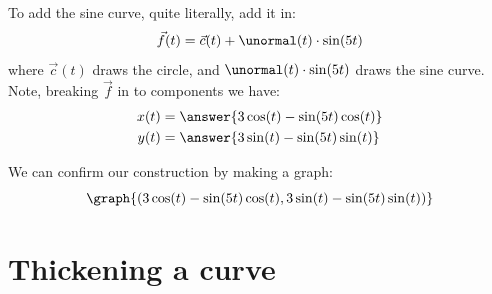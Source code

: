 \documentclass{ximera}
\begin{document}
\begin{example}
\begin{explanation}
\begin{image}
    \end{image}
    To add the sine curve, quite literally, add it in:
    \[
    \vec{f}(t) = \vec{c}(t) + \unormal(t)\cdot \sin(5t)
    \]
    where $\vec{c}(t)$ draws the circle, and $\unormal(t)\cdot
    \sin(5t)$ draws the sine curve. Note, breaking $\vec{f}$ in to components we have:
    \begin{align*}
      x(t) &= \answer{3\cos(t)-\sin(5t)\cos(t)}\\
      y(t) &= \answer{3\sin(t)-\sin(5t)\sin(t)}
    \end{align*}
    \begin{onlineOnly}
      We can confirm our construction by making a graph:
      \[
      \graph{(3\cos(t)-\sin(5t)\cos(t),3\sin(t)-\sin(5t)\sin(t))}
      \]
    \end{onlineOnly}
  \end{explanation}
\end{example}

\section{Thickening a curve}
\end{document}
